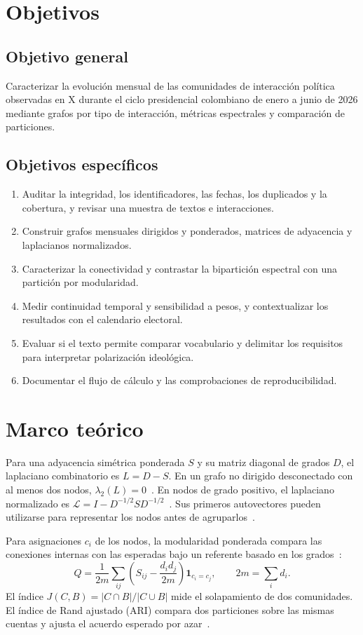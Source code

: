 \documentclass[journal]{IEEEtran}
\begin{document}
\section{Objetivos}
\subsection{Objetivo general}
Caracterizar la evolución mensual de las comunidades de interacción política observadas en X durante el ciclo presidencial colombiano de enero a junio de 2026 mediante grafos por tipo de interacción, métricas espectrales y comparación de particiones.
\subsection{Objetivos específicos}
\begin{enumerate}
\item Auditar la integridad, los identificadores, las fechas, los duplicados y la cobertura, y revisar una muestra de textos e interacciones.
\item Construir grafos mensuales dirigidos y ponderados, matrices de adyacencia y laplacianos normalizados.
\item Caracterizar la conectividad y contrastar la bipartición espectral con una partición por modularidad.
\item Medir continuidad temporal y sensibilidad a pesos, y contextualizar los resultados con el calendario electoral.
\item Evaluar si el texto permite comparar vocabulario y delimitar los requisitos para interpretar polarización ideológica.
\item Documentar el flujo de cálculo y las comprobaciones de reproducibilidad.
\end{enumerate}

\section{Marco teórico}
Para una adyacencia simétrica ponderada $S$ y su matriz diagonal de grados $D$, el laplaciano combinatorio es $L=D-S$. En un grafo no dirigido desconectado con al menos dos nodos, $\lambda_2(L)=0$~\cite{fiedler}. En nodos de grado positivo, el laplaciano normalizado es $\mathcal{L}=I-D^{-1/2}SD^{-1/2}$~\cite{chung}. Sus primeros autovectores pueden utilizarse para representar los nodos antes de agruparlos~\cite{luxburg}.

Para asignaciones $c_i$ de los nodos, la modularidad ponderada compara las conexiones internas con las esperadas bajo un referente basado en los grados~\cite{newman}:
\begin{equation}
Q=\frac{1}{2m}\sum_{ij}\left(S_{ij}-\frac{d_i d_j}{2m}\right)\mathbf{1}_{c_i=c_j},
\qquad 2m=\sum_i d_i .
\end{equation}
El índice $J(C,B)=|C\cap B|/|C\cup B|$ mide el solapamiento de dos comunidades. El índice de Rand ajustado (ARI) compara dos particiones sobre las mismas cuentas y ajusta el acuerdo esperado por azar~\cite{hubert}.
\end{document}
